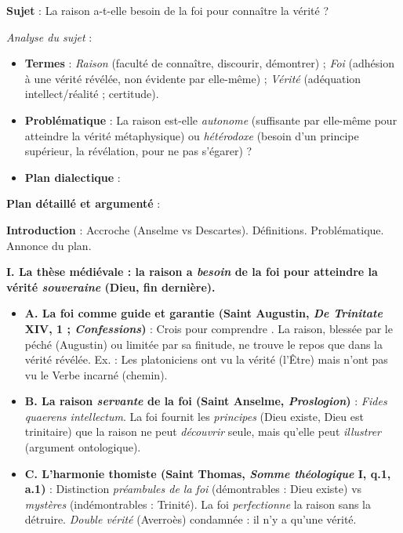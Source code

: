 \documentclass[11pt]{article}
\begin{document}
\begin{exoresolu}
\textbf{Sujet} : \guillemotleft La raison a-t-elle besoin de la foi pour connaître la vérité ? \guillemotright

\emph{Analyse du sujet} :
\begin{itemize}
    \item \textbf{Termes} : \emph{Raison} (faculté de connaître, discourir, démontrer) ; \emph{Foi} (adhésion à une vérité révélée, non évidente par elle-même) ; \emph{Vérité} (adéquation intellect/réalité ; certitude).
    \item \textbf{Problématique} : La raison est-elle \emph{autonome} (suffisante par elle-même pour atteindre la vérité métaphysique) ou \emph{hétérodoxe} (besoin d'un principe supérieur, la révélation, pour ne pas s'égarer) ?
    \item \textbf{Plan dialectique} :
\end{itemize}

\tcblower

\textbf{Plan détaillé et argumenté} :

\textbf{Introduction} : Accroche (Anselme vs Descartes). Définitions. Problématique. Annonce du plan.

\textbf{I. La thèse médiévale : la raison a \emph{besoin} de la foi pour atteindre la vérité \emph{souveraine} (Dieu, fin dernière).}
\begin{itemize}
    \item \textbf{A. La foi comme guide et garantie (Saint Augustin, \emph{De Trinitate} XIV, 1 ; \emph{Confessions})} : \guillemotleft Crois pour comprendre \guillemotright. La raison, blessée par le péché (Augustin) ou limitée par sa finitude, ne trouve le repos que dans la vérité révélée. Ex. : Les platoniciens ont vu la vérité (l'Être) mais n'ont pas vu le Verbe incarné (chemin).
    \item \textbf{B. La raison \emph{servante} de la foi (Saint Anselme, \emph{Proslogion})} : \emph{Fides quaerens intellectum}. La foi fournit les \emph{principes} (Dieu existe, Dieu est trinitaire) que la raison ne peut \emph{découvrir} seule, mais qu'elle peut \emph{illustrer} (argument ontologique).
    \item \textbf{C. L'harmonie thomiste (Saint Thomas, \emph{Somme théologique} I, q.1, a.1)} : Distinction \emph{préambules de la foi} (démontrables : Dieu existe) vs \emph{mystères} (indémontrables : Trinité). La foi \emph{perfectionne} la raison sans la détruire. \emph{Double vérité} (Averroès) condamnée : il n'y a qu'une vérité.
\end{itemize}


\end{exoresolu}
\end{document}
